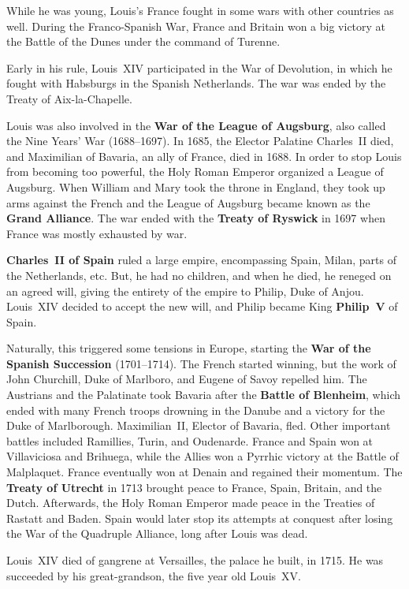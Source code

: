 While he was young, Louis's France fought in some wars with other countries as well.
During the Franco-Spanish War,
France and Britain won a big victory at the Battle of the Dunes under the command of Turenne.

Early in his rule, Louis~XIV participated in the War of Devolution,
in which he fought with Habsburgs in the Spanish Netherlands.
The war was ended by the Treaty of Aix-la-Chapelle.

Louis was also involved in the \textbf{War of the League of Augsburg},
also called the Nine Years' War (1688--1697).
In 1685, the Elector Palatine Charles~II died,
and Maximilian of Bavaria, an ally of France, died in 1688.
In order to stop Louis from becoming too powerful, the Holy Roman Emperor organized a League of Augsburg.
When William and Mary took the throne in England,
they took up arms against the French and the League of Augsburg became known as the \textbf{Grand Alliance}.
The war ended with the \textbf{Treaty of Ryswick} in 1697 when France was mostly exhausted by war.

\textbf{Charles~II of Spain} ruled a large empire, encompassing Spain, Milan, parts of the Netherlands, etc.
But, he had no children, and when he died, he reneged on an agreed will,
giving the entirety of the empire to Philip, Duke of Anjou.
Louis~XIV decided to accept the new will, and Philip became King \textbf{Philip~V} of Spain.

Naturally, this triggered some tensions in Europe,
starting the \textbf{War of the Spanish Succession} (1701--1714).
The French started winning, but the work of John Churchill, Duke of Marlboro, and Eugene of Savoy repelled him.
The Austrians and the Palatinate took Bavaria after the \textbf{Battle of Blenheim},
which ended with many French troops drowning in the Danube and a victory for the Duke of Marlborough.
Maximilian~II, Elector of Bavaria, fled.
Other important battles included Ramillies, Turin, and Oudenarde.
France and Spain won at Villaviciosa and Brihuega,
while the Allies won a Pyrrhic victory at the Battle of Malplaquet.
France eventually won at Denain and regained their momentum.
The \textbf{Treaty of Utrecht} in 1713 brought peace to France, Spain, Britain, and the Dutch.
Afterwards, the Holy Roman Emperor made peace in the Treaties of Rastatt and Baden.
Spain would later stop its attempts at conquest after losing the War of the Quadruple Alliance,
long after Louis was dead.

Louis~XIV died of gangrene at Versailles, the palace he built, in 1715.
He was succeeded by his great-grandson, the five year old Louis~XV\@.

